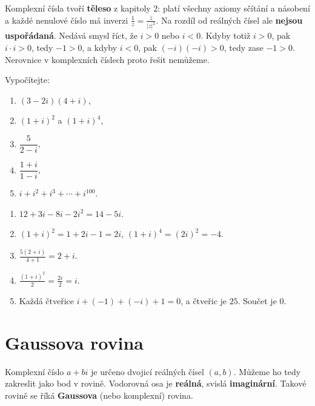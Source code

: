\begin{note}\label{note:komplexni-usporadani}
  Komplexní čísla tvoří \textbf{těleso} z kapitoly 2: platí všechny axiomy sčítání a násobení a každé nenulové číslo má inverzi $\frac{1}{z} = \frac{\bar{z}}{|z|^2}$. Na rozdíl od reálných čísel ale \textbf{nejsou uspořádaná}. Nedává smysl říct, že $i > 0$ nebo $i < 0$. Kdyby totiž $i > 0$, pak $i\cdot i > 0$, tedy $-1 > 0$, a kdyby $i < 0$, pak $(-i)(-i) > 0$, tedy zase $-1 > 0$. Nerovnice v komplexních číslech proto řešit nemůžeme.
\end{note}

\begin{problem}
  Vypočítejte:
  \begin{enumerate}[label=(\alph*)]
    \item $(3 - 2i)(4 + i)$,
    \item ${(1 + i)}^2$ a ${(1 + i)}^4$,
    \item $\dfrac{5}{2 - i}$,
    \item $\dfrac{1 + i}{1 - i}$,
    \item $i + i^2 + i^3 + \cdots + i^{100}$.
  \end{enumerate}
\end{problem}

\begin{solution}
  \begin{enumerate}[label=(\alph*)]
    \item $12 + 3i - 8i - 2i^2 = 14 - 5i$.
    \item ${(1 + i)}^2 = 1 + 2i - 1 = 2i$, ${(1 + i)}^4 = {(2i)}^2 = -4$.
    \item $\frac{5(2 + i)}{4 + 1} = 2 + i$.
    \item $\frac{{(1 + i)}^2}{2} = \frac{2i}{2} = i$.
    \item Každá čtveřice $i + (-1) + (-i) + 1 = 0$, a čtveřic je $25$. Součet je $0$.
  \end{enumerate}
\end{solution}

\section{Gaussova rovina}\label{sec:gaussova-rovina}

Komplexní číslo $a + bi$ je určeno dvojicí reálných čísel $(a, b)$. Můžeme ho tedy zakreslit jako bod v rovině. Vodorovná osa je \textbf{reálná}, svislá \textbf{imaginární}. Takové rovině se říká \textbf{Gaussova} (nebo komplexní) rovina.


